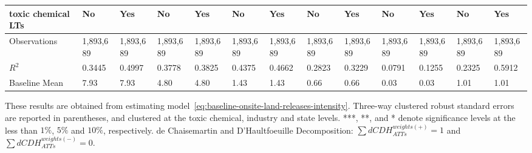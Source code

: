 \begin{table}[H]
{\begin{tabular}{@{}lllllllllllll@{}}
            toxic chemical LTs & No        & Yes       & No        & Yes       & No        & Yes       & No        & Yes       & No        & Yes       & No        & Yes       \\\midrule
            Observations       & 1,893,689 & 1,893,689 & 1,893,689 & 1,893,689 & 1,893,689 & 1,893,689 & 1,893,689 & 1,893,689 & 1,893,689 & 1,893,689 & 1,893,689 & 1,893,689 \\
            $R^2$              & 0.3445    & 0.4997    & 0.3778    & 0.3825    & 0.4375    & 0.4662    & 0.2823    & 0.3229    & 0.0791    & 0.1255    & 0.2325 & 0.5912 \\
            Baseline Mean      & 7.93      & 7.93      & 4.80      & 4.80      & 1.43      & 1.43      & 0.66      & 0.66      & 0.03      & 0.03      & 1.01      & 1.01      \\ \bottomrule\bottomrule
        \end{tabular}%
    }
    \begin{minipage}{18cm}
        \vspace{0.05in}
        These results are obtained from estimating model~\ref{eq:baseline-onsite-land-releases-intensity}. Three-way clustered robust standard errors are reported in parentheses, and clustered at the toxic chemical, industry and state levels. ***, **, and * denote significance levels at the less than $1\%$, $5\%$ and $10\%$, respectively. de Chaisemartin and D'Haultfoeuille Decomposition: $\sum dCDH_{ATTs}^{weights(+)} = 1$ and $\sum dCDH_{ATTs}^{weights(-)} = 0$.
    \end{minipage}
\end{table}